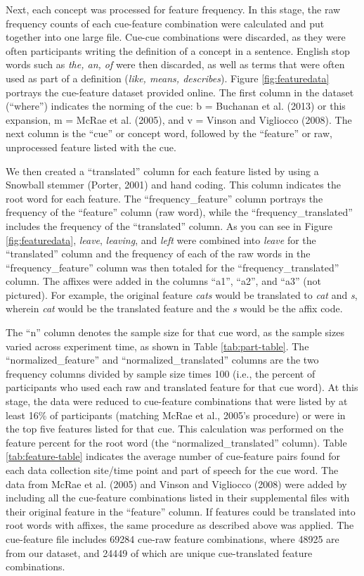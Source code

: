 \documentclass[english,,man]{apa6}
\begin{document}
Next, each concept was processed for feature frequency. In this stage, the raw frequency counts of each cue-feature combination were calculated and put together into one large file. Cue-cue combinations were discarded, as they were often participants writing the definition of a concept in a sentence. English stop words such as \emph{the, an, of} were then discarded, as well as terms that were often used as part of a definition (\emph{like, means, describes}). Figure \ref{fig:featuredata} portrays the cue-feature dataset provided online. The first column in the dataset (\enquote{where}) indicates the norming of the cue: b = Buchanan et al. (2013) or this expansion, m = McRae et al. (2005), and v = Vinson and Vigliocco (2008). The next column is the \enquote{cue} or concept word, followed by the \enquote{feature} or raw, unprocessed feature listed with the cue.

We then created a \enquote{translated} column for each feature listed by using a Snowball stemmer (Porter, 2001) and hand coding. This column indicates the root word for each feature. The \enquote{frequency\_feature} column portrays the frequency of the \enquote{feature} column (raw word), while the \enquote{frequency\_translated} includes the frequency of the \enquote{translated} column. As you can see in Figure \ref{fig:featuredata}, \emph{leave}, \emph{leaving}, and \emph{left} were combined into \emph{leave} for the \enquote{translated} column and the frequency of each of the raw words in the \enquote{frequency\_feature} column was then totaled for the \enquote{frequency\_translated} column. The affixes were added in the columns \enquote{a1}, \enquote{a2}, and \enquote{a3} (not pictured). For example, the original feature \emph{cats} would be translated to \emph{cat} and \emph{s}, wherein \emph{cat} would be the translated feature and the \emph{s} would be the affix code.

The \enquote{n} column denotes the sample size for that cue word, as the sample sizes varied across experiment time, as shown in Table \ref{tab:part-table}. The \enquote{normalized\_feature} and \enquote{normalized\_translated} columns are the two frequency columns divided by sample size times 100 (i.e., the percent of participants who used each raw and translated feature for that cue word). At this stage, the data were reduced to cue-feature combinations that were listed by at least 16\% of participants (matching McRae et al., 2005's procedure) or were in the top five features listed for that cue. This calculation was performed on the feature percent for the root word (the \enquote{normalized\_translated} column). Table \ref{tab:feature-table} indicates the average number of cue-feature pairs found for each data collection site/time point and part of speech for the cue word. The data from McRae et al. (2005) and Vinson and Vigliocco (2008) were added by including all the cue-feature combinations listed in their supplemental files with their original feature in the \enquote{feature} column. If features could be translated into root words with affixes, the same procedure as described above was applied. The cue-feature file includes 69284 cue-raw feature combinations, where 48925 are from our dataset, and 24449 of which are unique cue-translated feature combinations.
\end{document}
